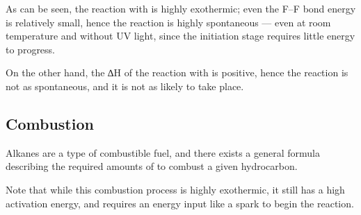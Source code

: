


				As can be seen, the reaction with  is highly exothermic; even the F–F bond energy is relatively small, hence the
				reaction is highly spontaneous --- even at room temperature and without UV light, since the initiation stage requires
				little energy to progress.

				On the other hand, the ∆H of the reaction with  is positive, hence the reaction is not as spontaneous, and it is not
				as likely to take place.



		\pagebreak
		\subsection{Combustion}

			Alkanes are a type of combustible fuel, and there exists a general formula describing the required amounts of 
			to combust a given hydrocarbon.


			Note that while this combustion process is highly exothermic, it still has a high activation energy, and requires an energy
			input like a spark to begin the reaction.


















